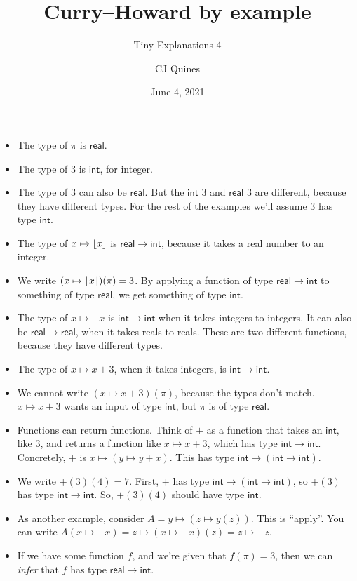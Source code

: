 \documentclass[11pt,paper=letter]{scrartcl}
\newcommand{\sf}{\mathsf}
\begin{document}
\title{Curry--Howard by example}
\subtitle{Tiny Explanations 4}
\author{CJ Quines}
\date{June 4, 2021}

\maketitle

\begin{itemize}[leftmargin=*]
\item The type of $\pi$ is $\sf{real}$.
\item The type of $3$ is $\sf{int}$, for integer.
\item The type of $3$ can also be $\sf{real}$. But the $\sf{int}$ $3$ and $\sf{real}$ $3$ are different, because they have different types. For the rest of the examples we'll assume $3$ has type $\sf{int}$.
\item The type of $x \mapsto \left\lfloor x \right\rfloor$ is $\sf{real} \to \sf{int}$, because it takes a real number to an integer.
\item We write $(x \mapsto \left\lfloor x \right\rfloor)(\pi) = 3$. By applying a function of type $\sf{real} \to \sf{int}$ to something of type $\sf{real}$, we get something of type $\sf{int}$.
\item The type of $x \mapsto -x$ is $\sf{int} \to \sf{int}$ when it takes integers to integers. It can also be $\sf{real} \to \sf{real}$, when it takes reals to reals. These are two different functions, because they have different types.
\item The type of $x \mapsto x + 3$, when it takes integers, is $\sf{int} \to \sf{int}$.
\item We cannot write $(x \mapsto x + 3)(\pi)$, because the types don't match. $x \mapsto x + 3$ wants an input of type $\sf{int}$, but $\pi$ is of type $\sf{real}$.
\item Functions can return functions. Think of $+$ as a function that takes an $\sf{int}$, like $3$, and returns a function like $x \mapsto x+3$, which has type $\sf{int} \to \sf{int}$. Concretely, $+$ is $x \mapsto (y \mapsto y + x)$. This has type $\sf{int} \to (\sf{int} \to \sf{int})$.
\item We write $+(3)(4) = 7$. First, $+$ has type $\sf{int} \to (\sf{int} \to \sf{int})$, so $+(3)$ has type $\sf{int} \to \sf{int}$. So, $+(3)(4)$ should have type $\sf{int}$.
\item As another example, consider $A = y \mapsto (z \mapsto y(z))$. This is ``apply''. You can write $A(x \mapsto -x) = z \mapsto (x \mapsto -x)(z) = z \mapsto -z$.
\item If we have some function $f$, and we're given that $f(\pi) = 3$, then we can \emph{infer} that $f$ has type $\sf{real} \to \sf{int}$.

\end{itemize}
\end{document}
